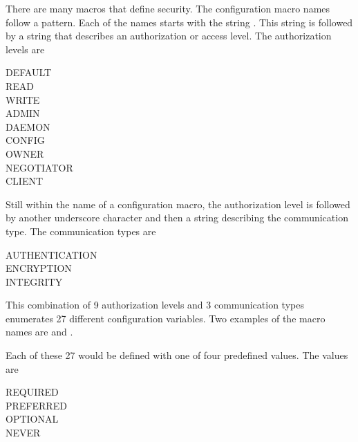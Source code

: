 
There are many macros that define security.
The configuration macro names follow a pattern.
Each of the names starts with the string
.
This string is followed by a string that describes an
authorization or access level.
The authorization levels are
\begin{description}
    \item[DEFAULT]
    \item[READ]
    \item[WRITE]
    \item[ADMIN]
    \item[DAEMON]
    \item[CONFIG]
    \item[OWNER]
    \item[NEGOTIATOR]
    \item[CLIENT]
\end{description}
Still within the name of a configuration macro,
the authorization level is followed by another underscore
character and then a string describing the communication type.
The communication types are
\begin{description}
    \item[AUTHENTICATION]
    \item[ENCRYPTION]
    \item[INTEGRITY]
\end{description}
This combination of 9 authorization levels and 3 communication types
enumerates 27 different configuration variables.
Two examples of the macro names are
and
.

Each of these 27 would be defined with one of four predefined values.
The values are
\begin{description}
    \item[REQUIRED]
    \item[PREFERRED]
    \item[OPTIONAL]
    \item[NEVER] 
\end{description}

